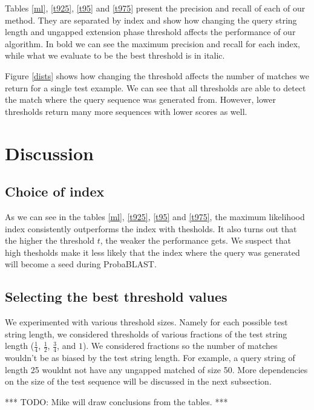 \documentclass[12pt]{IEEEtran}
\begin{document}
Tables \ref{ml}, \ref{t925}, \ref{t95} and \ref{t975} present the precision and recall of each of our method. They are separated by index and show how changing the query string length and ungapped extension phase threshold affects the performance of our algorithm. In bold we can see the maximum precision and recall for each index, while what we evaluate to be the best threshold is in italic.

Figure \ref{dists} shows how changing the threshold affects the number of matches we return for a single test example. We can see that all thresholds are able to detect the match where the query sequence was generated from. However, lower thresholds return many more sequences with lower scores as well.


\section{Discussion}

\subsection{Choice of index}

As we can see in the tables \ref{ml}, \ref{t925}, \ref{t95} and \ref{t975}, the maximum likelihood index consistently outperforms the index with thesholds. It also turns out that the higher the threshold $t$, the weaker the performance gets. We suspect that high thesholds make it less likely that the index where the query was generated will become a seed during ProbaBLAST. 

\subsection{Selecting the best threshold values}


We experimented with various threshold sizes. Namely for each possible test string length, we considered thresholds of various fractions of the test string length ($\frac{1}{4}$, $\frac{1}{2}$, $\frac{3}{4}$, and $1$). We considered fractions so the number of matches wouldn't be as biased by the test string length. For example, a query string of length 25 wouldnt not have any ungapped matched of size 50. More dependencies on the size of the test sequence will be discussed in the next subsection.

*** TODO: Mike will draw conclusions from the tables. ***
\end{document}
